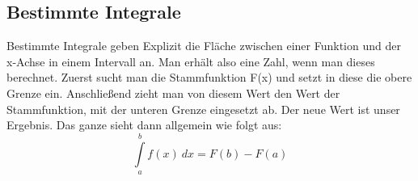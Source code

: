 \subsection{Bestimmte Integrale}
	Bestimmte Integrale geben Explizit die Fläche zwischen einer Funktion und der
	x-Achse in einem Intervall an. Man erhält also eine Zahl, wenn man dieses
	berechnet. Zuerst sucht man die Stammfunktion F(x) und setzt in diese die obere
	Grenze ein. Anschließend zieht man von diesem Wert den Wert der Stammfunktion,
	mit der unteren Grenze eingesetzt ab. Der neue Wert ist unser Ergebnis. Das
	ganze sieht dann allgemein wie folgt aus:
	\[\int\limits_a^b f(x) \ dx=F(b)-F(a)\]
